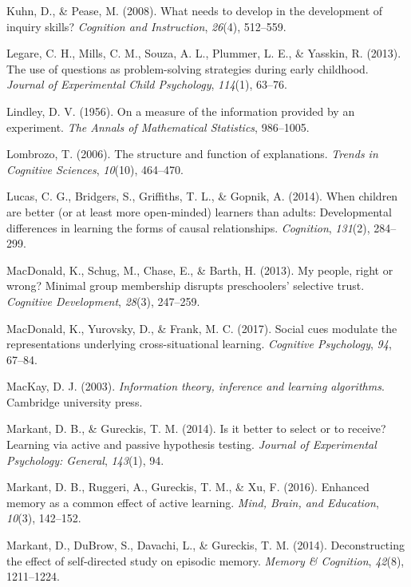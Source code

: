 \documentclass[english,floatsintext,man]{apa6}
\theoremstyle{definition}
\theoremstyle{definition}
\theoremstyle{definition}
\theoremstyle{remark}
\begin{document}
\hypertarget{ref-kuhn2008needs}{}
Kuhn, D., \& Pease, M. (2008). What needs to develop in the development
of inquiry skills? \emph{Cognition and Instruction}, \emph{26}(4),
512--559.

\hypertarget{ref-legare2013use}{}
Legare, C. H., Mills, C. M., Souza, A. L., Plummer, L. E., \& Yasskin,
R. (2013). The use of questions as problem-solving strategies during
early childhood. \emph{Journal of Experimental Child Psychology},
\emph{114}(1), 63--76.

\hypertarget{ref-lindley1956measure}{}
Lindley, D. V. (1956). On a measure of the information provided by an
experiment. \emph{The Annals of Mathematical Statistics}, 986--1005.

\hypertarget{ref-lombrozo2006structure}{}
Lombrozo, T. (2006). The structure and function of explanations.
\emph{Trends in Cognitive Sciences}, \emph{10}(10), 464--470.

\hypertarget{ref-lucas2014children}{}
Lucas, C. G., Bridgers, S., Griffiths, T. L., \& Gopnik, A. (2014). When
children are better (or at least more open-minded) learners than adults:
Developmental differences in learning the forms of causal relationships.
\emph{Cognition}, \emph{131}(2), 284--299.

\hypertarget{ref-macdonald2013my}{}
MacDonald, K., Schug, M., Chase, E., \& Barth, H. (2013). My people,
right or wrong? Minimal group membership disrupts preschoolers'
selective trust. \emph{Cognitive Development}, \emph{28}(3), 247--259.

\hypertarget{ref-macdonald2017social}{}
MacDonald, K., Yurovsky, D., \& Frank, M. C. (2017). Social cues
modulate the representations underlying cross-situational learning.
\emph{Cognitive Psychology}, \emph{94}, 67--84.

\hypertarget{ref-mackay2003information}{}
MacKay, D. J. (2003). \emph{Information theory, inference and learning
algorithms}. Cambridge university press.

\hypertarget{ref-markant2014better}{}
Markant, D. B., \& Gureckis, T. M. (2014). Is it better to select or to
receive? Learning via active and passive hypothesis testing.
\emph{Journal of Experimental Psychology: General}, \emph{143}(1), 94.

\hypertarget{ref-markant2016enhanced}{}
Markant, D. B., Ruggeri, A., Gureckis, T. M., \& Xu, F. (2016). Enhanced
memory as a common effect of active learning. \emph{Mind, Brain, and
Education}, \emph{10}(3), 142--152.

\hypertarget{ref-markant2014deconstructing}{}
Markant, D., DuBrow, S., Davachi, L., \& Gureckis, T. M. (2014).
Deconstructing the effect of self-directed study on episodic memory.
\emph{Memory \& Cognition}, \emph{42}(8), 1211--1224.
\end{document}
